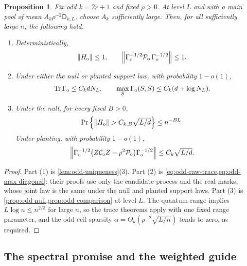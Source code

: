 \documentclass[11pt]{article}
\newtheorem{proposition}[proposition]{Proposition}
\theoremstyle{definition}
\theoremstyle{remark}
\newcommand{\1}{\mathbf 1}
\newcommand{\cC}{\mathcal C}
\newcommand{\cP}{\mathcal P}
\DeclareMathOperator{\Tr}{Tr}
\numberwithin{equation}{section}
\begin{document}
\begin{proposition}\label{prop:quantum-odd-normalization}
Fix odd $k=2r+1$ and fixed $\rho>0$.  At level $L$ and with a main
pool of mean $A_k\rho^{-2}\mathsf D_{k,L}$, choose $A_k$ sufficiently
large.  Then, for all sufficiently large $n$, the following hold.
\begin{enumerate}
\item Deterministically,
\begin{equation}\label{eq:quantum-odd-domination}
 \|H_{\rm o}\|\le1,
 \qquad
 \left\|\Gamma_{\rm o}^{-1/2}
 \cP_{\rm o}\,\Gamma_{\rm o}^{-1/2}\right\|\le1.
\end{equation}
\item Under either the null or planted support law, with probability
$1-o(1)$,
\begin{equation}\label{eq:quantum-odd-diagonal-bounds}
 \Tr\Gamma_{\rm o}\le C_kdN_L,
 \qquad
 \max_S\Gamma_{\rm o}(S,S)
 \le C_k(d+\log N_L).
\end{equation}
\item Under the null, for every fixed $B>0$,
\begin{equation}\label{eq:quantum-odd-null}
 \Pr\left\{\|H_{\rm o}\|>
 C_{k,B}\sqrt{L/d}\right\}\le n^{-BL}.
\end{equation}
Under planting, with probability $1-o(1)$,
\begin{equation}\label{eq:quantum-odd-comparison}
 \left\|\Gamma_{\rm o}^{-1/2}
 \bigl(Z\cC_{\rm o}Z-\rho^2\cP_{\rm o}\bigr)
 \Gamma_{\rm o}^{-1/2}\right\|
 \le C_k\sqrt{L/d}.
\end{equation}
\end{enumerate}
\end{proposition}
\begin{proof}
Part (1) is \cref{lem:odd-uniqueness}(3).  Part (2) is
\cref{eq:odd-raw-trace,eq:odd-max-diagonal}: their proofs use only the
candidate process and the real marks, whose joint law is the same under
the null and planted support laws.  Part (3) is
\cref{prop:odd-null,prop:odd-comparison} at level $L$.  The quantum
range implies $L\log n\le n^{2/3}$ for large $n$, so the trace theorems
apply with one fixed range parameter, and the odd cell sparsity
$\alpha=\Theta_k(\rho^{-2}\sqrt{L/n})$ tends to zero, as required.
\end{proof}

\subsection{The spectral promise and the weighted guide}
\label{sec:quantum-promise}
\end{document}
